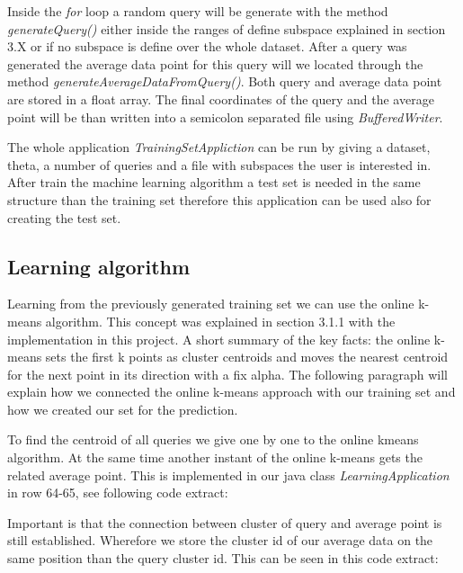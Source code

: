 \documentclass{lmproj}
\begin{document}
Inside the \textit{for} loop a random query will be generate with the method \textit{generateQuery()} either inside the ranges of define subspace explained in section 3.X or if no subspace is define over the whole dataset. After a query was generated the average data point for this query will we located through the method \textit{generateAverageDataFromQuery()}. Both query and average data point are stored in a float array. The final coordinates of the query and the average point will be than written into a semicolon separated file using \textit{BufferedWriter}.

The whole application \textit{TrainingSetAppliction} can be run by giving a dataset, theta, a number of queries and a file with subspaces the user is interested in.
After train the machine learning algorithm a test set is needed in the same structure than the training set therefore this application can be used also for creating the test set. 


\subsection{Learning algorithm}

Learning from the previously generated training set we can use the online k-means algorithm. This concept was explained in section 3.1.1 with the implementation in this project. 
A short summary of the key facts: the online k-means sets the first k points as cluster centroids and moves the nearest centroid for the next point in its direction with a fix alpha. 
The following paragraph will explain how we connected the online k-means approach with our training set and how we created our set for the prediction.

To find the centroid of all queries we give one by one to the online kmeans algorithm. At the same time another instant of the online k-means gets the related average point. This is implemented in our java class \textit{LearningApplication} in row 64-65, see following code extract:



Important is that the connection between cluster of query and average point is still established. Wherefore we store the cluster id of our average data on the same position than the query cluster id. This can be seen in this code extract:

\end{document}
